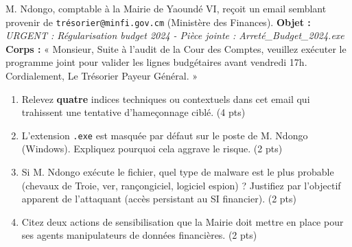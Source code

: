 \documentclass[11pt]{article}
\begin{document}
\begin{exercice}
M. Ndongo, comptable à la Mairie de Yaoundé VI, reçoit un email semblant provenir de \texttt{trésorier@minfi.gov.cm} (Ministère des Finances).
\textbf{Objet :} \textit{URGENT : Régularisation budget 2024 - Pièce jointe : Arreté\_Budget\_2024.exe}
\textbf{Corps :} « Monsieur, Suite à l'audit de la Cour des Comptes, veuillez exécuter le programme joint pour valider les lignes budgétaires avant vendredi 17h. Cordialement, Le Trésorier Payeur Général. »
\begin{enumerate}
    \item Relevez \textbf{quatre} indices techniques ou contextuels dans cet email qui trahissent une tentative d'hameçonnage ciblé. \hfill (4 pts)
    \item L'extension \texttt{.exe} est masquée par défaut sur le poste de M. Ndongo (Windows). Expliquez pourquoi cela aggrave le risque. \hfill (2 pts)
    \item Si M. Ndongo exécute le fichier, quel type de malware est le plus probable (chevaux de Troie, ver, rançongiciel, logiciel espion) ? Justifiez par l'objectif apparent de l'attaquant (accès persistant au SI financier). \hfill (2 pts)
    \item Citez deux actions de sensibilisation que la Mairie doit mettre en place pour ses agents manipulateurs de données financières. \hfill (2 pts)
\end{enumerate}
\end{exercice}
\end{document}
